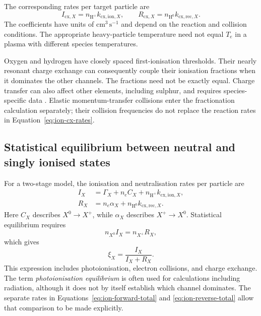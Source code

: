 The corresponding rates per target particle are
\begin{equation}
 I_{\mathrm{cx},X}=n_{\mathrm{H^+}}k_{\mathrm{cx,ion},X},
 \qquad R_{\mathrm{cx},X}=n_{\mathrm{H^0}}k_{\mathrm{cx,rec},X}.
 \label{eq:ion-cx-rates}
\end{equation}
The coefficients have units of $\mathrm{cm^3\,s^{-1}}$ and depend on the
reaction and collision conditions. The appropriate heavy-particle
temperature need not equal $T_e$ in a plasma with different species
temperatures.

Oxygen and hydrogen have closely spaced first-ionisation thresholds.
Their nearly resonant charge exchange can consequently couple their
ionisation fractions when it dominates the other channels.
The fractions need not be exactly equal. Charge transfer can also affect
other elements, including sulphur, and requires species-specific data
\citep{Dufresne2021,Laming2021}. Elastic momentum-transfer collisions
enter the fractionation calculation separately; their collision frequencies
do not replace the reaction rates in Equation~\eqref{eq:ion-cx-rates}.

\subsection{Statistical equilibrium between neutral and singly ionised states}

For a two-stage model, the ionisation and neutralisation rates per particle are
\begin{align}
 I_X &= \Gamma_X+n_e C_X+n_{\mathrm{H^+}}k_{\mathrm{cx,ion},X},
 \label{eq:ion-forward-total}\\
 R_X &= n_e\alpha_X+n_{\mathrm{H^0}}k_{\mathrm{cx,rec},X}.
 \label{eq:ion-reverse-total}
\end{align}
Here $C_X$ describes $X^0\rightarrow X^+$, while $\alpha_X$ describes
$X^+\rightarrow X^0$. Statistical equilibrium requires
\begin{equation}
 n_{X^0}I_X=n_{X^+}R_X,
\end{equation}
which gives
\begin{equation}
 \xi_X=\frac{I_X}{I_X+R_X}.
 \label{eq:ion-two-state-equilibrium}
\end{equation}
This expression includes photoionisation, electron collisions, and charge
exchange. The term \emph{photoionisation equilibrium} is often used for
calculations including radiation, although it does not by itself establish
which channel dominates. The separate rates in
Equations~\eqref{eq:ion-forward-total} and \eqref{eq:ion-reverse-total}
allow that comparison to be made explicitly.

